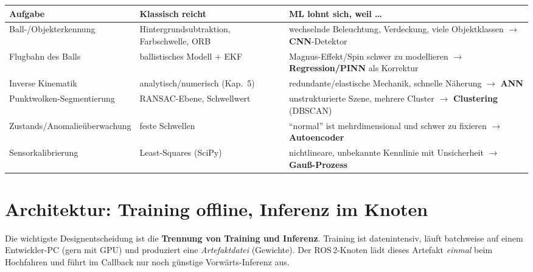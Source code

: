 \begin{longtable}{@{}p{3.6cm}p{4.3cm}p{6.6cm}@{}}
\toprule
\textbf{Aufgabe} & \textbf{Klassisch reicht} & \textbf{ML lohnt sich, weil \ldots} \\
\midrule
Ball-/Objekt\-erkennung
  & Hintergrundsubtraktion, Farbschwelle, ORB
  & wechselnde Beleuchtung, Verdeckung, viele Objektklassen $\rightarrow$ \textbf{CNN}-Detektor \\
Flugbahn des Balls
  & ballistisches Modell + EKF
  & Magnus-Effekt/Spin schwer zu modellieren $\rightarrow$ \textbf{Regression/PINN} als Korrektur \\
Inverse Kinematik
  & analytisch/numerisch (Kap.~5)
  & redundante/elastische Mechanik, schnelle Näherung $\rightarrow$ \textbf{ANN} \\
Punktwolken-Seg\-mentierung
  & RANSAC-Ebene, Schwellwert
  & unstrukturierte Szene, mehrere Cluster $\rightarrow$ \textbf{Clustering} (DBSCAN) \\
Zustands\-/Anomalie\-überwachung
  & feste Schwellen
  & ``normal'' ist mehrdimensional und schwer zu fixieren $\rightarrow$ \textbf{Autoencoder} \\
Sensor\-kalibrierung
  & Least-Squares (SciPy)
  & nichtlineare, unbekannte Kennlinie mit Unsicherheit $\rightarrow$ \textbf{Gauß-Prozess} \\
\bottomrule
\end{longtable}

\section{Architektur: Training offline, Inferenz im Knoten}
Die wichtigste Designentscheidung ist die \textbf{Trennung von Training und
Inferenz}. Training ist datenintensiv, läuft batchweise auf einem Entwickler-PC
(gern mit GPU) und produziert eine \emph{Artefaktdatei} (Gewichte). Der
ROS\,2-Knoten lädt dieses Artefakt \emph{einmal} beim Hochfahren und führt im
Callback nur noch günstige Vorwärts-Inferenz aus.

